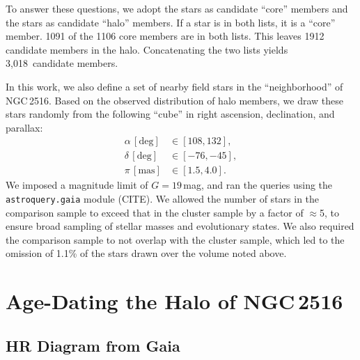\documentclass[12pt,twocolumn,tighten]{aastex63}
\newcommand{\cn}{NGC\,2516} %
\newcommand{\nkinematic}{3{,}018\ } %
\begin{document}
To answer these questions, we adopt the
 stars as candidate ``core''
members and the  stars as
candidate ``halo'' members.  If a star is in both lists, it is a
``core'' member.  1091 of the 1106 core members are in both lists.
This leaves 1912 candidate members in the halo.
Concatenating the two lists yields \nkinematic candidate members.

In this work, we also define a set of nearby field stars in the
``neighborhood'' of \cn.  Based on the observed distribution of halo
members, we draw these stars randomly from the following ``cube'' in
right ascension, declination, and parallax:
\begin{align}
  \alpha\,[\mathrm{deg}] &\in [108, 132], \\
  \delta\,[\mathrm{deg}] &\in [-76, -45], \\
  \pi\,[\mathrm{mas}] &\in [1.5, 4.0].
\end{align}
We imposed a magnitude limit of $G=19$\,mag, and ran the queries
using the \texttt{astroquery.gaia} module (CITE).
We allowed the number of stars in the comparison sample to exceed that
in the cluster sample by a factor of $\approx$5, to ensure broad sampling
of stellar masses and evolutionary states.
We also required the comparison sample to not overlap with the cluster
sample, which led to the omission of 1.1\% of the stars drawn over the
volume noted above.


\section{Age-Dating the Halo of NGC\,2516}
\label{sec:agedate}

\subsection{HR Diagram from Gaia}
\label{subsec:hr}
\end{document}
